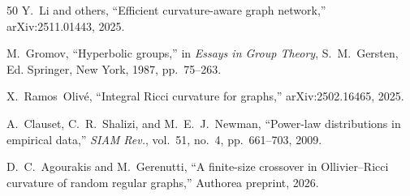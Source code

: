 \documentclass[11pt,a4paper]{article}
\begin{document}
\begin{thebibliography}{50}
Y.~Li and others, ``Efficient curvature-aware graph network,'' arXiv:2511.01443, 2025.

M.~Gromov, ``Hyperbolic groups,'' in \emph{Essays in Group Theory}, S.~M.~Gersten, Ed. Springer, New York, 1987, pp.~75--263.

X.~Ramos~Oliv\'e, ``Integral Ricci curvature for graphs,'' arXiv:2502.16465, 2025.

A.~Clauset, C.~R.~Shalizi, and M.~E.~J.~Newman, ``Power-law distributions in empirical data,'' \emph{SIAM Rev.}, vol.~51, no.~4, pp.~661--703, 2009.

D.~C.~Agourakis and M.~Gerenutti, ``A finite-size crossover in Ollivier--Ricci curvature of random regular graphs,'' Authorea preprint, 2026.

\end{thebibliography}
\end{document}
